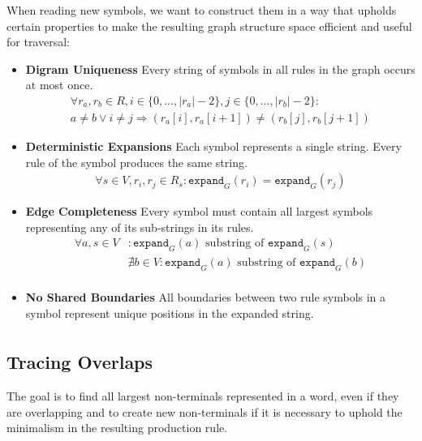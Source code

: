 When reading new symbols, we want to construct them in a way that upholds certain properties to make the resulting graph structure space efficient and useful for traversal:
\begin{itemize}
    \item \textbf{Digram Uniqueness} Every string of symbols in all rules in the graph occurs at most once.
    \begin{gather*}
        \forall r_a, r_b \in R, i \in \{ 0, ..., |r_a| - 2 \}, j \in \{ 0, ..., |r_b| - 2 \}:\\
        a \neq b \lor i \neq j \Longrightarrow (r_a[i], r_a[i + 1]) \neq (r_b[j], r_b[j + 1])
    \end{gather*}

    \item \textbf{Deterministic Expansions} Each symbol represents a single string. Every rule of the symbol produces the same string.
    \begin{align*}
        \forall s \in V, r_i, r_j \in R_s: \texttt{expand}_G(r_i) = \texttt{expand}_G(r_j)
    \end{align*}

    \item \textbf{Edge Completeness} Every symbol must contain all largest symbols representing any of its sub-strings in its rules.
    \begin{align*}
        \forall a, s \in V&: \texttt{expand}_G(a) \text{ substring of } \texttt{expand}_G(s) \\
        &\nexists b \in V: \texttt{expand}_G(a) \text{ substring of } \texttt{expand}_G(b) \\
    \end{align*}

    \item \textbf{No Shared Boundaries} All boundaries between two rule symbols in a symbol represent unique positions in the expanded string.
    \begin{gather*}
    \end{gather*}
\end{itemize}

\subsection{Tracing Overlaps}
The goal is to find all largest non-terminals represented in a word, even if they are overlapping and to create
new non-terminals if it is necessary to uphold the minimalism in the resulting production rule.

